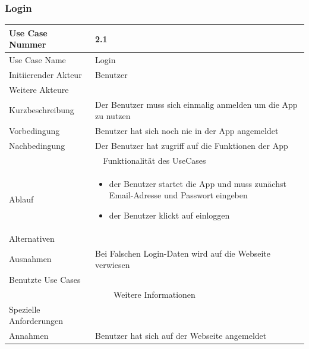 \documentclass[10pt,a4paper]{article}
\begin{document}
\subsubsection{Login}
		\begin{tabular}{|l|p{.5\linewidth}|}
		\hline Use Case Nummer & 2.1 \\ 
		\hline Use Case Name & Login \\ 
		\hline Initiierender Akteur & Benutzer \\
		\hline Weitere Akteure &  \\
		\hline Kurzbeschreibung & Der Benutzer muss sich einmalig anmelden um die App zu nutzen \\
		\hline Vorbedingung & Benutzer hat sich noch nie in der App angemeldet \\
		\hline Nachbedingung & Der Benutzer hat zugriff auf die Funktionen der App \\
		\hline \multicolumn{2}{|c|}{Funktionalität des UseCases}\\
		\hline Ablauf & \begin{itemize}
			\item der Benutzer startet die App und muss zunächst Email-Adresse und Passwort eingeben
			\item der Benutzer klickt auf einloggen
		\end{itemize} \\
		\hline Alternativen &  \\
		\hline Ausnahmen & Bei Falschen Login-Daten wird auf die Webseite verwiesen \\
		\hline Benutzte Use Cases &  \\
		\hline \multicolumn{2}{|c|}{Weitere Informationen} \\
		\hline Spezielle Anforderungen &  \\
		\hline Annahmen & Benutzer hat sich auf der Webseite angemeldet \\
		\hline
		\end{tabular}
\end{document}
